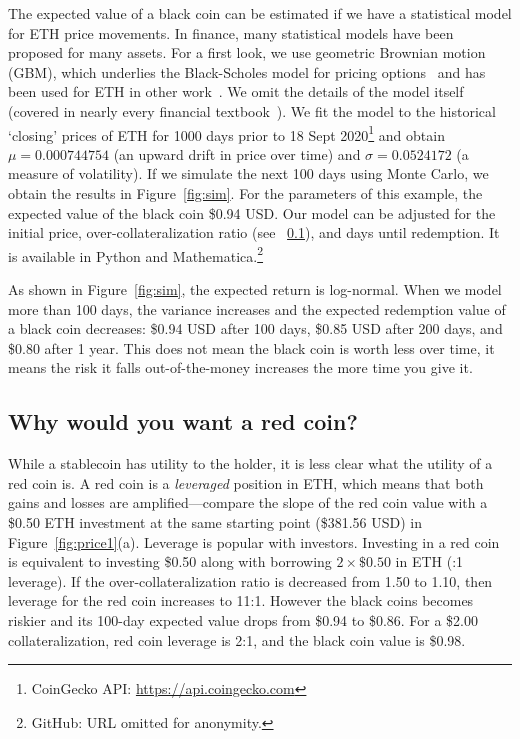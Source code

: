 The expected value of a black coin can be estimated if we have a statistical model for ETH price movements. In finance, many statistical models have been proposed for many assets. For a first look, we use geometric Brownian motion (GBM), which underlies the Black-Scholes model for pricing options~\cite{BS73} and has been used for ETH in other work~\cite{GPH+20}. We omit the details of the model itself (covered in nearly every  financial textbook~\cite{Sey09}). We fit the model to the historical `closing' prices of ETH for 1000 days prior to 18 Sept 2020\footnote{CoinGecko API: \url{https://api.coingecko.com}} and obtain $\mu=0.000744754$ (an upward drift in price over time) and $\sigma=0.0524172$ (a measure of volatility). If we simulate the next 100 days using Monte Carlo, we obtain the results in Figure~\ref{fig:sim}. For the parameters of this example, the expected value of the black coin \$0.94 USD. Our model can be adjusted for the initial price, over-collateralization ratio (see ~\ref{sec:redchar}), and days until redemption. It is available in Python and Mathematica.\footnote{GitHub: URL omitted for anonymity.} 

As shown in Figure~\ref{fig:sim}, the expected return is log-normal. When we model more than 100 days, the variance increases and the expected redemption value of a black coin decreases: \$0.94 USD after 100 days, \$0.85 USD after 200 days, and \$0.80 after 1 year. This does not mean the black coin is worth less over time, it means the risk it falls out-of-the-money increases the more time you give it. 


\subsection{Why would you want a red coin?}
\label{sec:redchar}

While a stablecoin has utility to the holder, it is less clear what the utility of a red coin is. A red coin is a \textit{leveraged} position in ETH, which means that both gains and losses are amplified---compare the slope of the red coin value with a \$0.50 ETH investment at the same starting point (\$381.56 USD) in Figure~\ref{fig:price1}(a). Leverage is popular with investors. Investing in a red coin is equivalent to investing \$0.50 along with borrowing $2\times\$0.50$ in ETH (:1 leverage). If the over-collateralization ratio is decreased from 1.50 to 1.10, then leverage for the red coin increases to 11:1. However the black coins becomes riskier and its 100-day expected value drops from \$0.94 to \$0.86. For a \$2.00 collateralization, red coin leverage is 2:1, and the black coin value is \$0.98. 

